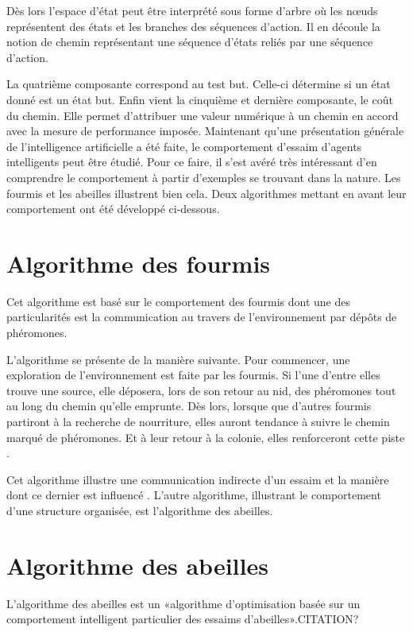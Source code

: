 \documentclass[a4paper,12pt]{report}
\begin{document}
Dès lors l'espace d'état peut être interprété sous forme d'arbre où les nœuds représentent des états et les branches des séquences d'action. Il en découle la notion de chemin représentant une séquence d'états reliés par une séquence d'action.

La quatrième composante correspond au test but. Celle-ci détermine si un état donné est un état but. Enfin vient la cinquième et dernière composante, le coût du chemin. Elle permet d'attribuer une valeur numérique à un chemin en accord avec la mesure de performance imposée.
Maintenant qu'une présentation générale de l'intelligence artificielle a été faite, le comportement d'essaim d'agents intelligents peut être étudié. Pour ce faire, il s'est avéré très intéressant d'en comprendre le comportement à partir d'exemples se trouvant dans la nature. Les fourmis et les abeilles illustrent bien cela. Deux algorithmes mettant en avant leur comportement ont été développé ci-dessous.

\section{Algorithme des fourmis}

Cet algorithme est basé sur le comportement des fourmis dont une des particularités est la communication au travers de l'environnement par dépôts de phéromones.

L'algorithme se présente de la manière suivante. Pour commencer, une exploration de l'environnement est faite par les fourmis. Si l'une d'entre elles trouve une source, elle déposera, lors de son retour au nid, des phéromones tout au long du chemin qu'elle emprunte. Dès lors, lorsque que d'autres fourmis partiront à la recherche de nourriture, elles auront tendance à suivre le chemin  marqué de phéromones. Et à leur retour à la colonie, elles renforceront cette piste \cite{wikiFourmi}.

Cet algorithme illustre une communication indirecte d'un essaim et la manière dont ce dernier est influencé \cite{communicationFourmis}. L'autre algorithme, illustrant le comportement d'une structure organisée, est l'algorithme des abeilles.

\section{Algorithme des abeilles}

L'algorithme des abeilles est un «algorithme d'optimisation basée sur un comportement intelligent particulier des essaims d'abeilles».CITATION?
\end{document}
